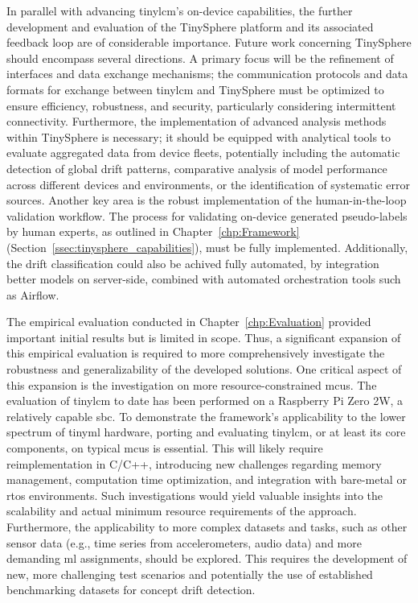 In parallel with advancing \gls{tinylcm}'s on-device capabilities, the further development and evaluation of the TinySphere platform and its associated feedback loop are of considerable importance. Future work concerning TinySphere should encompass several directions. A primary focus will be the refinement of interfaces and data exchange mechanisms; the communication protocols and data formats for exchange between \gls{tinylcm} and TinySphere must be optimized to ensure efficiency, robustness, and security, particularly considering intermittent connectivity. Furthermore, the implementation of advanced analysis methods within TinySphere is necessary; it should be equipped with analytical tools to evaluate aggregated data from device fleets, potentially including the automatic detection of global drift patterns, comparative analysis of model performance across different devices and environments, or the identification of systematic error sources. Another key area is the robust implementation of the human-in-the-loop validation workflow. The process for validating on-device generated pseudo-labels by human experts, as outlined in Chapter~\ref{chp:Framework} (Section~\ref{ssec:tinysphere_capabilities}), must be fully implemented. Additionally, the drift classification could also be achived fully automated, by integration better models on server-side, combined with automated orchestration tools such as Airflow.

The empirical evaluation conducted in Chapter~\ref{chp:Evaluation} provided important initial results but is limited in scope. Thus, a significant expansion of this empirical evaluation is required to more comprehensively investigate the robustness and generalizability of the developed solutions. One critical aspect of this expansion is the investigation on more resource-constrained \glspl{mcu}. The evaluation of \gls{tinylcm} to date has been performed on a Raspberry Pi Zero 2W, a relatively capable \gls{sbc}. To demonstrate the framework's applicability to the lower spectrum of \gls{tinyml} hardware, porting and evaluating \gls{tinylcm}, or at least its core components, on typical \glspl{mcu} is essential. This will likely require reimplementation in C/C++, introducing new challenges regarding memory management, computation time optimization, and integration with bare-metal or \gls{rtos} environments. Such investigations would yield valuable insights into the scalability and actual minimum resource requirements of the approach. Furthermore, the applicability to more complex datasets and tasks, such as other sensor data (e.g., time series from accelerometers, audio data) and more demanding \gls{ml} assignments, should be explored. This requires the development of new, more challenging test scenarios and potentially the use of established benchmarking datasets for concept drift detection.

